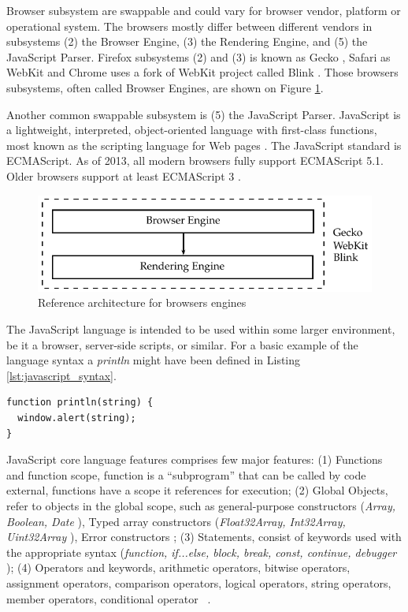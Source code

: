 Browser subsystem are swappable and could vary for browser vendor, platform or operational system. The browsers mostly differ between different vendors in subsystems (2) the Browser Engine, (3) the Rendering Engine, and (5) the JavaScript Parser. Firefox subsystems (2) and (3) is known as Gecko \cite{Firefox2013} \cite{Gecko2013}, Safari as WebKit \cite{Safari2013} \cite{WebKit2013} and Chrome uses a fork of WebKit project called Blink \cite{Chrome2010} \cite{Blink2013}. Those browsers subsystems, often called Browser Engines, are shown on Figure \ref{figure:web_architecture_engines}.

Another common swappable subsystem is (5) the JavaScript Parser. JavaScript is a lightweight, interpreted, object-oriented language with first-class functions, most known as the scripting language for Web pages \cite{Gecko2013}. The JavaScript standard is ECMAScript. As of 2013, all modern browsers fully support ECMAScript 5.1. Older browsers support at least ECMAScript 3 \cite{Gecko2013} \cite{International2009}.

\begin{figure}[!htb]
  \centering
  \includegraphics{chapters/basic_concepts/web_architecture_engines.pdf}
  \caption{Reference architecture for browsers engines}
  \label{figure:web_architecture_engines}
\end{figure}

The JavaScript language is intended to be used within some larger environment, be it a browser, server-side scripts, or similar. For a basic example of the language syntax a \textit{println} might have been defined in Listing \ref{lst:javascript_syntax}.

\begin{lstlisting}[label={lst:javascript_syntax},caption=Basic example of JavaScript syntax]
function println(string) {
  window.alert(string);
}
\end{lstlisting}

JavaScript core language features comprises few major features: (1) Functions and function scope, function is a ``subprogram'' that can be called by code external, functions have a scope it references for execution; (2) Global Objects, refer to objects in the global scope, such as general-purpose constructors (\textit{Array, Boolean, Date} \etc), Typed array constructors (\textit{Float32Array, Int32Array, Uint32Array} \etc), Error constructors \etc; (3) Statements, consist of keywords used with the appropriate syntax (\textit{function, if...else, block, break, const, continue, debugger \etc}); (4) Operators and keywords, arithmetic operators, bitwise operators, assignment operators, comparison operators, logical operators, string operators, member operators, conditional operator \etc\ \cite{MDN2013}.

